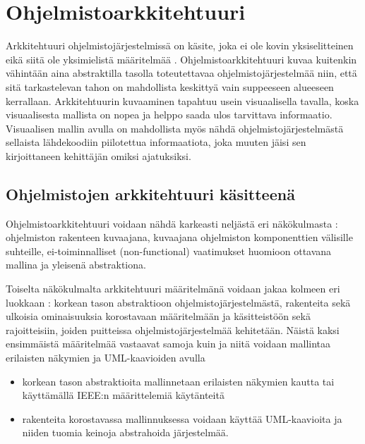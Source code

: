 \documentclass[finnish]{tktltiki2}
\numberwithin{table}{section}
\theoremstyle{definition}
\theoremstyle{remark}
\begin{document}
\section{Ohjelmistoarkkitehtuuri} \label{software_architecture_main}
Arkkitehtuuri ohjelmistojärjestelmissä on käsite, joka ei ole kovin yksiselitteinen eikä siitä ole yksimielistä määritelmää \citep[s. 363]{solms_what_2012}. 
Ohjelmistoarkkitehtuuri kuvaa kuitenkin vähintään aina abstraktilla tasolla toteutettavaa ohjelmistojärjestelmää niin, että sitä tarkastelevan tahon on mahdollista keskittyä vain suppeeseen alueeseen kerrallaan. Arkkitehtuurin kuvaaminen tapahtuu usein visuaalisella tavalla, koska visuaalisesta mallista on nopea ja helppo saada ulos tarvittava informaatio. Visuaalisen mallin avulla on mahdollista myös nähdä ohjelmistojärjestelmästä sellaista lähdekoodiin piilotettua informaatiota, joka muuten jäisi sen kirjoittaneen kehittäjän omiksi ajatuksiksi.   

\subsection{Ohjelmistojen arkkitehtuuri käsitteenä} \label{ark}
Ohjelmistoarkkitehtuuri voidaan nähdä karkeasti neljästä eri näkökulmasta  \citep[s. 2-7]{gorton_understanding_2011}:  ohjelmiston rakenteen kuvaajana, kuvaajana ohjelmiston komponenttien välisille suhteille, ei-toiminnalliset (non-functional) vaatimukset huomioon ottavana mallina ja yleisenä abstraktiona. 

Toiselta näkökulmalta arkkitehtuuri määritelmänä voidaan jakaa kolmeen eri luokkaan \citep{solms_what_2012}: korkean tason abstraktioon ohjelmistojärjestelmästä, rakenteita sekä ulkoisia ominaisuuksia korostavaan määritelmään ja käsitteistöön sekä rajoitteisiin, joiden puitteissa ohjelmistojärjestelmää kehitetään. Näistä kaksi ensimmäistä määritelmää vastaavat samoja kuin \cite{gorton_understanding_2011} ja niitä voidaan mallintaa erilaisten näkymien ja UML-kaavioiden avulla

\begin{itemize}
	\item korkean tason abstraktioita mallinnetaan erilaisten näkymien kautta tai käyttämällä IEEE:n määrittelemiä käytänteitä
	\item rakenteita korostavassa mallinnuksessa voidaan käyttää UML-kaavioita ja niiden tuomia keinoja abstrahoida järjestelmää.
	
\end{itemize}
\end{document}
